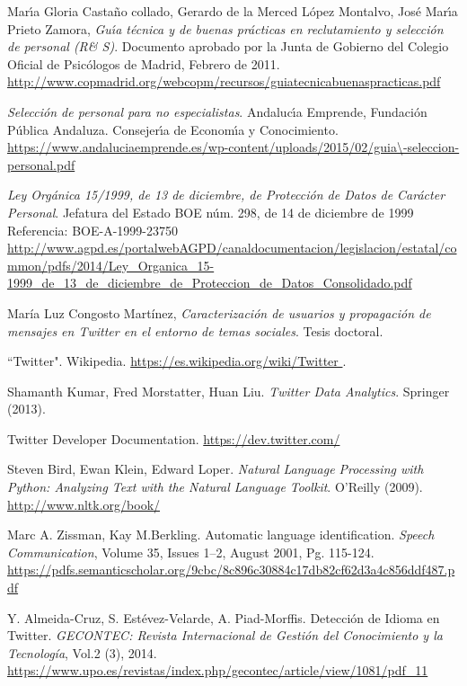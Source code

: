 
\begin{thebibliography}{3}

Mar\'\i a Gloria Casta\~no collado, Gerardo de la Merced L\'opez Montalvo, Jos\'e Mar\'\i a Prieto Zamora,
\textit{Gu\'\i a t\'ecnica y de buenas pr\'acticas en reclutamiento y selecci\'on de personal (R\& S)}.
Documento aprobado por la Junta de Gobierno del Colegio Oficial de Psicólogos de Madrid, Febrero de 2011.
\url{http://www.copmadrid.org/webcopm/recursos/guiatecnicabuenaspracticas.pdf}

\textit{Selecci\'on de personal para no especialistas}.
Andaluc\'\i a Emprende, Fundaci\'on P\'ublica Andaluza. Consejer\'\i a de Econom\'\i a y Conocimiento.
\url{https://www.andaluciaemprende.es/wp-content/uploads/2015/02/guia\-seleccion-personal.pdf}

\textit{Ley Orgánica 15/1999, de 13 de diciembre, de Protección de Datos
de Carácter Personal}.
Jefatura del Estado BOE núm. 298, de 14 de diciembre de 1999
Referencia: BOE-A-1999-23750
\url{http://www.agpd.es/portalwebAGPD/canaldocumentacion/legislacion/estatal/common/pdfs/2014/Ley_Organica_15-1999_de_13_de_diciembre_de_Proteccion_de_Datos_Consolidado.pdf}

María Luz Congosto Martínez,
\textit{Caracterización de usuarios y propagación de mensajes en Twitter en el entorno de temas sociales}.
Tesis doctoral.

``Twitter". Wikipedia. \url{https://es.wikipedia.org/wiki/Twitter }.

Shamanth Kumar, Fred Morstatter, Huan Liu. 
{\em  Twitter Data Analytics}. Springer (2013).

 Twitter Developer Documentation. \url{https://dev.twitter.com/}

Steven Bird, Ewan Klein, Edward Loper. {\em Natural Language Processing with Python: 
Analyzing Text with the Natural Language Toolkit}. O'Reilly (2009). \url{http://www.nltk.org/book/}

 Marc A. Zissman, Kay M.Berkling. Automatic language identification. {\em Speech Communication}, Volume 35, Issues 1–2, August 2001, Pg. 115-124.
\url{https://pdfs.semanticscholar.org/9cbc/8c896c30884c17db82cf62d3a4c856ddf487.pdf}

 Y. Almeida-Cruz, S. Estévez-Velarde, A.  Piad-Morffis. Detección de Idioma en Twitter.
{\em GECONTEC: Revista Internacional de Gestión del Conocimiento y la Tecnología}, Vol.2 (3), 2014.
\url{https://www.upo.es/revistas/index.php/gecontec/article/view/1081/pdf_11}


\end{thebibliography}
